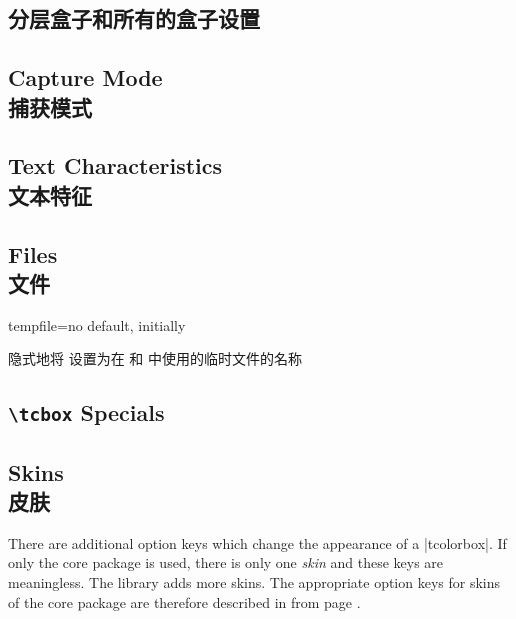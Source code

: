 \subsection{分层盒子和所有的盒子设置}\label{subsec:everybox}

\subsection{Capture Mode\\捕获模式}\label{subsec:capture}

\subsection{Text Characteristics\\文本特征}

% 
\subsection{Files\\文件}
\begin{docTcbKey}{tempfile}{=}{no default, initially }

隐式地将   设置为在  和  中使用的临时文件的名称
\end{docTcbKey}
\subsection{\texttt{\textbackslash tcbox} Specials}

\subsection{Skins\\皮肤}
There are additional option keys which change the appearance of a |tcolorbox|.
If only the core package is used, there is only one \emph{skin} and these
keys are meaningless.
The library  adds more skins. The appropriate option keys for skins of
the core package are therefore described in  from
page \pageref{sec:skincorekeys}.

